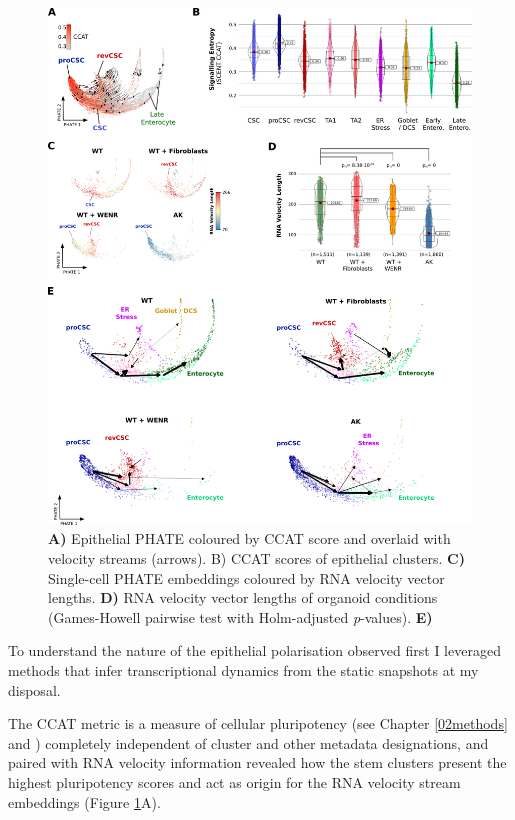 \begin{figure}
    \centering
    \includegraphics{04seq/figs/4SEQ_Dynamics.png}
    \caption{\textbf{A)} Epithelial PHATE coloured by CCAT score and overlaid with velocity streams (arrows). B) CCAT scores of epithelial clusters. \textbf{C)} Single-cell PHATE embeddings coloured by RNA velocity vector lengths. \textbf{D)} RNA velocity vector lengths of organoid conditions (Games-Howell pairwise test with Holm-adjusted \textit{p}-values). \textbf{E)} }
    \label{fig:4dyn}
\end{figure}

To understand the nature of the epithelial polarisation observed first I leveraged methods that infer transcriptional dynamics from the static snapshots at my disposal.

The CCAT metric is a measure of cellular pluripotency (see Chapter \ref{02methods} and \cite{teschendorff_single-cell_2017}) completely independent of cluster and other metadata designations, and paired with RNA velocity information \cite{bergen_generalizing_2020} revealed how the stem clusters present the highest pluripotency scores and act as origin for the RNA velocity stream embeddings (Figure \ref{fig:4dyn}A).


